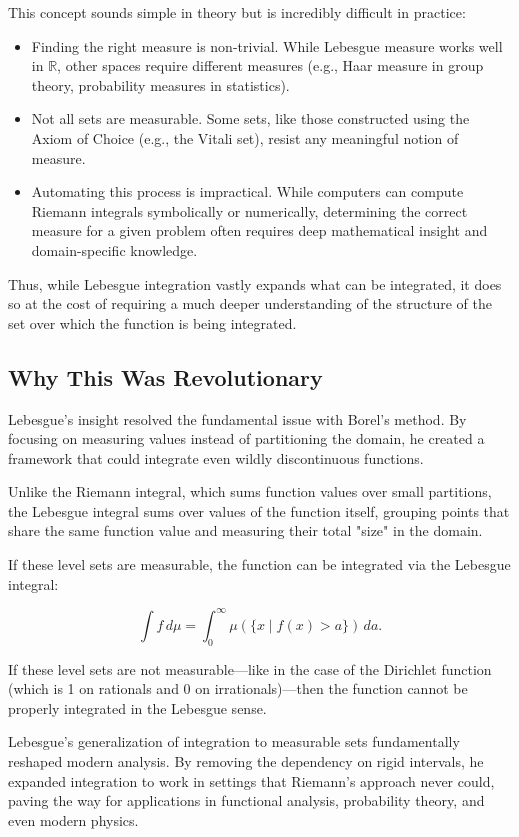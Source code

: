 This concept sounds simple in theory but is incredibly difficult in practice:

\begin{itemize}
    \item Finding the right measure is non-trivial. While Lebesgue measure works well in \(\mathbb{R}\), other spaces require different measures (e.g., Haar measure in group theory, probability measures in statistics).
    \item Not all sets are measurable. Some sets, like those constructed using the Axiom of Choice (e.g., the Vitali set), resist any meaningful notion of measure.
    \item Automating this process is impractical. While computers can compute Riemann integrals symbolically or numerically, determining the correct measure for a given problem often requires deep mathematical insight and domain-specific knowledge.
\end{itemize}

Thus, while Lebesgue integration vastly expands what can be integrated, it does so at the cost of requiring a much deeper understanding of the structure of the set over which the function is being integrated.

\subsection{Why This Was Revolutionary}

Lebesgue’s insight resolved the fundamental issue with Borel’s method. By focusing on measuring values instead of partitioning the domain, he created a framework that could integrate even wildly discontinuous functions.

Unlike the Riemann integral, which sums function values over small partitions, the Lebesgue integral sums over values of the function itself, grouping points that share the same function value and measuring their total "size" in the domain. 

If these level sets are measurable, the function can be integrated via the Lebesgue integral:

\[
\int f \, d\mu = \int_0^\infty \mu(\{ x \mid f(x) > a \}) \, da.
\]

If these level sets are not measurable—like in the case of the Dirichlet function (which is 1 on rationals and 0 on irrationals)—then the function cannot be properly integrated in the Lebesgue sense.

Lebesgue’s generalization of integration to measurable sets fundamentally reshaped modern analysis. By removing the dependency on rigid intervals, he expanded integration to work in settings that Riemann’s approach never could, paving the way for applications in functional analysis, probability theory, and even modern physics.

